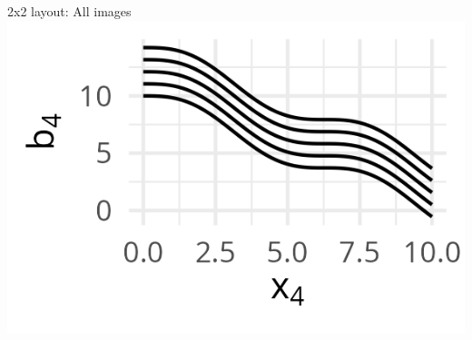 \documentclass[11pt,compress,t,notes=noshow, xcolor=table]{beamer}
\begin{document}
\begin{vbframe}{2x2 layout: All images}
{  }{%
  \includegraphics[width=\textwidth]{figure/boosting-cwb-blpool4.png}
  }
  \end{vbframe}

\endlecture
\end{document}
